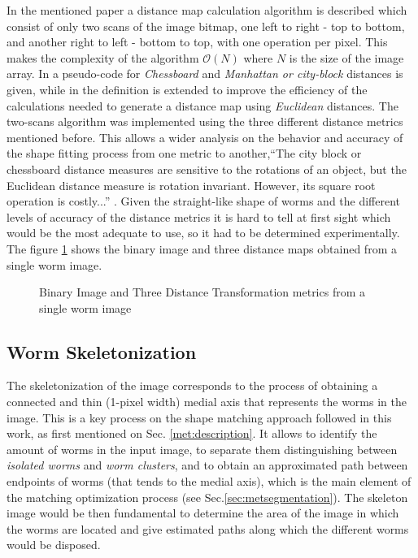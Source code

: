 In the mentioned paper a distance map calculation algorithm is described which consist
of only two scans of the image bitmap, one left to right - top to bottom, and another
right to left - bottom to top, with one operation per pixel. This makes the complexity
of the algorithm $\mathcal{O}(N)$ where $N$ is the size of the image array.
In \cite[p.197]{fastdt} a pseudo-code for \emph{Chessboard} and 
\emph{Manhattan or city-block} distances is given, while in \cite[p.198]{fastdt} the 
definition is extended to improve the efficiency of the calculations needed to 
generate a distance map using \emph{Euclidean} distances.
The two-scans algorithm was implemented using the three different distance metrics
mentioned before. This allows a wider analysis on the behavior and accuracy of the shape 
fitting process from one metric to another,``The city block or chessboard distance
measures are sensitive to the rotations of an object, but the Euclidean distance
measure is rotation invariant. However, its square root operation is costly...''
\cite[p.332]{eucskeleton}. Given the straight-like shape of worms and the different levels
of accuracy of the distance metrics it is hard to tell at first sight which would be 
the most adequate to use, so it had to be determined experimentally.
The figure \ref{fig:distance} shows the binary image and three distance maps obtained 
from a single worm image.

\begin{figure}[h t b p ! H]
  \centering
\qquad
\qquad                
\qquad
  \caption{Binary Image and Three Distance Transformation metrics from a single worm image}
  \label{fig:distance}
\end{figure}


\subsection{Worm Skeletonization}
\label{sec:metsk}

The skeletonization of the image corresponds to the process of obtaining a 
connected and thin (1-pixel width) medial axis that represents the worms in the 
image. This is a key process on the shape matching
approach followed in this work, as first mentioned on Sec. \ref{met:description}.
It allows to identify the amount of worms in the input image, to separate them 
distinguishing between \emph{isolated worms} and \emph{worm clusters}, and to
obtain an approximated path between endpoints 
of worms (that tends to the medial axis), which is the main element of the 
matching optimization process (see Sec.\ref{sec:metsegmentation}). The skeleton
image would be then fundamental to determine the area of the image in which
the worms are located and give estimated paths along which the different
worms would be disposed. \\

